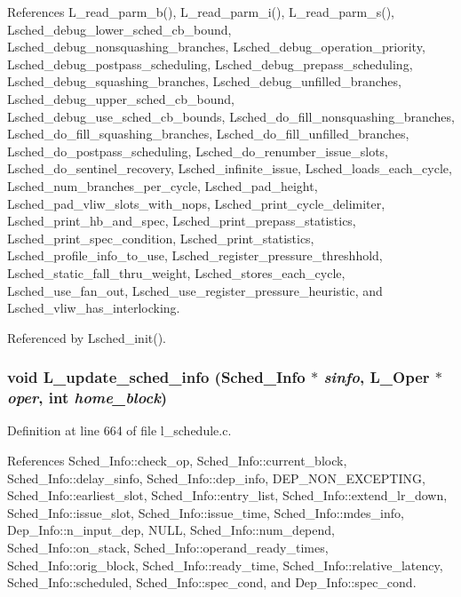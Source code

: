 References L\_\-read\_\-parm\_\-b(), L\_\-read\_\-parm\_\-i(), L\_\-read\_\-parm\_\-s(), Lsched\_\-debug\_\-lower\_\-sched\_\-cb\_\-bound, Lsched\_\-debug\_\-nonsquashing\_\-branches, Lsched\_\-debug\_\-operation\_\-priority, Lsched\_\-debug\_\-postpass\_\-scheduling, Lsched\_\-debug\_\-prepass\_\-scheduling, Lsched\_\-debug\_\-squashing\_\-branches, Lsched\_\-debug\_\-unfilled\_\-branches, Lsched\_\-debug\_\-upper\_\-sched\_\-cb\_\-bound, Lsched\_\-debug\_\-use\_\-sched\_\-cb\_\-bounds, Lsched\_\-do\_\-fill\_\-nonsquashing\_\-branches, Lsched\_\-do\_\-fill\_\-squashing\_\-branches, Lsched\_\-do\_\-fill\_\-unfilled\_\-branches, Lsched\_\-do\_\-postpass\_\-scheduling, Lsched\_\-do\_\-renumber\_\-issue\_\-slots, Lsched\_\-do\_\-sentinel\_\-recovery, Lsched\_\-infinite\_\-issue, Lsched\_\-loads\_\-each\_\-cycle, Lsched\_\-num\_\-branches\_\-per\_\-cycle, Lsched\_\-pad\_\-height, Lsched\_\-pad\_\-vliw\_\-slots\_\-with\_\-nops, Lsched\_\-print\_\-cycle\_\-delimiter, Lsched\_\-print\_\-hb\_\-and\_\-spec, Lsched\_\-print\_\-prepass\_\-statistics, Lsched\_\-print\_\-spec\_\-condition, Lsched\_\-print\_\-statistics, Lsched\_\-profile\_\-info\_\-to\_\-use, Lsched\_\-register\_\-pressure\_\-threshhold, Lsched\_\-static\_\-fall\_\-thru\_\-weight, Lsched\_\-stores\_\-each\_\-cycle, Lsched\_\-use\_\-fan\_\-out, Lsched\_\-use\_\-register\_\-pressure\_\-heuristic, and Lsched\_\-vliw\_\-has\_\-interlocking.

Referenced by Lsched\_\-init().
\subsubsection{\setlength{\rightskip}{0pt plus 5cm}void L\_\-update\_\-sched\_\-info (\bf{Sched\_\-Info} $\ast$ {\em sinfo}, L\_\-Oper $\ast$ {\em oper}, int {\em home\_\-block})}\label{l__schedule_8c_3d2397076410181103f5fea34a5acff0}




Definition at line 664 of file l\_\-schedule.c.

References Sched\_\-Info::check\_\-op, Sched\_\-Info::current\_\-block, Sched\_\-Info::delay\_\-sinfo, Sched\_\-Info::dep\_\-info, DEP\_\-NON\_\-EXCEPTING, Sched\_\-Info::earliest\_\-slot, Sched\_\-Info::entry\_\-list, Sched\_\-Info::extend\_\-lr\_\-down, Sched\_\-Info::issue\_\-slot, Sched\_\-Info::issue\_\-time, Sched\_\-Info::mdes\_\-info, Dep\_\-Info::n\_\-input\_\-dep, NULL, Sched\_\-Info::num\_\-depend, Sched\_\-Info::on\_\-stack, Sched\_\-Info::operand\_\-ready\_\-times, Sched\_\-Info::orig\_\-block, Sched\_\-Info::ready\_\-time, Sched\_\-Info::relative\_\-latency, Sched\_\-Info::scheduled, Sched\_\-Info::spec\_\-cond, and Dep\_\-Info::spec\_\-cond.

